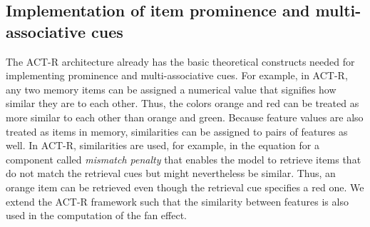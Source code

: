 \documentclass{cambridge7A}\usepackage[]{graphicx}\usepackage[]{color}
\begin{document}















\subsection{Implementation of item prominence and multi-associative cues}
\label{sec:impl}

The ACT-R architecture already has the basic theoretical constructs needed for implementing prominence and multi-associative cues.
For example, in ACT-R, any two memory items can be assigned a numerical value that signifies how similar they are to each other. Thus, the colors orange and red can be treated as more similar to each other than orange and green. Because feature values  are also treated as items in memory, similarities can be assigned to pairs of features as well.
In ACT-R, similarities are used, for example, in the equation for a component called \emph{mismatch penalty} that enables the model to retrieve items that do not match the retrieval cues but might nevertheless be similar. Thus, an orange item can be retrieved even though the retrieval cue specifies a red one.
We extend the ACT-R framework such that the similarity between features is also used in the computation of the fan effect. 
\end{document}
